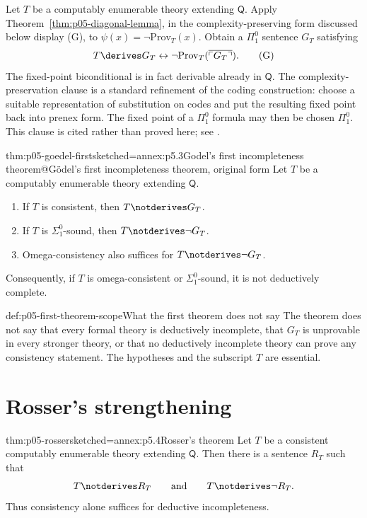 Let \(T\) be a computably enumerable theory extending \(\mathsf Q\).
Apply Theorem~\ref{thm:p05-diagonal-lemma}, in the complexity-preserving
form discussed below display (G), to
\(\psi(x)=\neg\mathrm{Prov}_T(x)\).  Obtain a \(\Pi^0_1\) sentence
\(G_T\) satisfying
\[
  T\derives G_T\leftrightarrow
  \neg\mathrm{Prov}_T(\overline{\ulcorner G_T\urcorner}).
  \tag{G}
\]
The fixed-point biconditional is in fact derivable already in
\(\mathsf Q\).  The complexity-preservation clause is a standard
refinement of the coding construction: choose a suitable representation
of substitution on codes and put the resulting fixed point back into
prenex form.  The fixed point of a \(\Pi^0_1\) formula may then be chosen
\(\Pi^0_1\).  This clause is cited rather than proved here; see
\cite{Shoenfield1967}.

\begin{hbtheorem}{thm:p05-goedel-first}{sketched=annex:p5.3}{Godel's first incompleteness theorem@G\"odel's first incompleteness theorem, original form}
Let \(T\) be a computably enumerable theory extending \(\mathsf Q\).
\begin{enumerate}
  \item If \(T\) is consistent, then \(T\notderives G_T\).
  \item If \(T\) is \(\Sigma^0_1\)-sound, then
        \(T\notderives\neg G_T\).
  \item Omega-consistency also suffices for
        \(T\notderives\neg G_T\).
\end{enumerate}
Consequently, if \(T\) is omega-consistent or \(\Sigma^0_1\)-sound, it is
not deductively complete.
\end{hbtheorem}

\begin{hbwarning}{def:p05-first-theorem-scope}{What the first theorem does not say}
The theorem does not say that every formal theory is deductively
incomplete, that \(G_T\) is unprovable in every stronger theory, or that
no deductively incomplete theory can prove any consistency statement.
The hypotheses and the subscript \(T\) are essential.
\end{hbwarning}

\section{Rosser's strengthening}
\label{sec:p05-diagonalization-04}

\begin{hbtheorem}{thm:p05-rosser}{sketched=annex:p5.4}{Rosser's theorem}
Let \(T\) be a consistent computably enumerable theory extending
\(\mathsf Q\).  Then there is a sentence \(R_T\) such that
\[
  T\notderives R_T
  \qquad\text{and}\qquad
  T\notderives\neg R_T.
\]
Thus consistency alone suffices for deductive incompleteness.
\end{hbtheorem}


